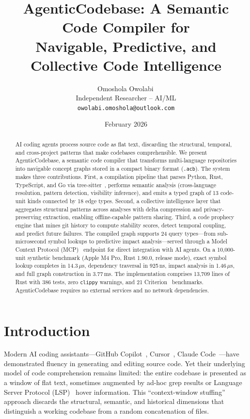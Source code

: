 \documentclass[10pt, twocolumn]{article}
\title{\textbf{AgenticCodebase: A Semantic Code Compiler for\\Navigable, Predictive, and Collective Code Intelligence}}
\author{Omoshola Owolabi\,\href{https://orcid.org/0009-0006-4089-0732}{\orcidicon}\\Independent Researcher -- AI/ML\\\texttt{owolabi.omoshola@outlook.com}}
\date{February 2026}
\newcommand{\acb}{AgenticCodebase\xspace}
\newcommand{\acbfile}{\texttt{.acb}\xspace}
\begin{document}
\maketitle
\thispagestyle{fancy}

\begin{abstract}
AI coding agents process source code as flat text, discarding the structural, temporal, and cross-project patterns that make codebases comprehensible. We present \acb, a semantic code compiler that transforms multi-language repositories into navigable concept graphs stored in a compact binary format (\acbfile). The system makes three contributions. First, a compilation pipeline that parses Python, Rust, TypeScript, and Go via tree-sitter~\cite{treesitter2018}, performs semantic analysis (cross-language resolution, pattern detection, visibility inference), and emits a typed graph of 13 code-unit kinds connected by 18 edge types. Second, a collective intelligence layer that aggregates structural patterns across analyses with delta compression and privacy-preserving extraction, enabling offline-capable pattern sharing. Third, a code prophecy engine that mines git history to compute stability scores, detect temporal coupling, and predict future failures. The compiled graph supports 24 query types---from sub-microsecond symbol lookups to predictive impact analysis---served through a Model Context Protocol (MCP)~\cite{mcp2024} endpoint for direct integration with AI agents. On a 10{,}000-unit synthetic benchmark (Apple M4 Pro, Rust 1.90.0, release mode), exact symbol lookup completes in 14.3\,$\mu$s, dependency traversal in 925\,ns, impact analysis in 1.46\,$\mu$s, and full graph construction in 3.77\,ms. The implementation comprises 13{,}709 lines of Rust with 386 tests, zero \texttt{clippy} warnings, and 21 Criterion~\cite{criterion2023} benchmarks. AgenticCodebase requires no external services and no network dependencies.
\end{abstract}

\section{Introduction}
\label{sec:intro}

Modern AI coding assistants---GitHub Copilot~\cite{copilot2021}, Cursor~\cite{cursor2024}, Claude Code~\cite{claudecode2025}---have demonstrated fluency in generating and editing source code. Yet their underlying model of code comprehension remains limited: the entire codebase is presented as a window of flat text, sometimes augmented by ad-hoc grep results or Language Server Protocol (LSP)~\cite{lsp2024} hover information. This ``context-window stuffing'' approach discards the structural, semantic, and historical dimensions that distinguish a working codebase from a random concatenation of files.
\end{document}
